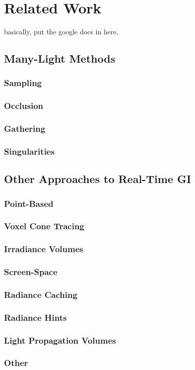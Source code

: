 
\chapter{Related Work}

basically, put the google docs in here.

\section{Many-Light Methods}

\subsection{Sampling}

\subsection{Occlusion}

\subsection{Gathering}

\subsection{Singularities}



\section{Other Approaches to Real-Time GI}

\subsection{Point-Based}

\subsection{Voxel Cone Tracing}

\subsection{Irradiance Volumes}

\subsection{Screen-Space}

\subsection{Radiance Caching}

\subsection{Radiance Hints}

\subsection{Light Propagation Volumes}

\subsection{Other}



\cleardoublepage

